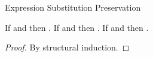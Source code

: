 \begin{lemma}{Expression Substitution Preservation}

\label{lemexp}

If \judeh{\envexte{\env}{\first{\varvarh}}{\first{\vartyh}}}{\first{\varexph}}{\second{\vartyh}} and \judeh{\env}{\second{\varexph}}{\first{\vartyh}} then \judeh{\env}{\expsubst{\first{\varexph}}{\second{\varexph}}{\first{\varvarh}}}{\second{\vartyh}}.  If \judem{\envexte{\env}{\first{\varvarm}}{\first{\vartym}}}{\first{\varexpm}}{\second{\vartym}} and \judem{\env}{\second{\varexpm}}{\first{\vartym}} then \judem{\env}{\expsubst{\first{\varexpm}}{\second{\varexpm}}{\first{\varvarm}}}{\second{\vartym}}.  If \judes{\envexte{\env}{\first{\varvars}}{\tytst}}{\first{\varexps}}{\tytst} and \judes{\env}{\second{\varexps}}{\tytst} then \judes{\env}{\expsubst{\first{\varexps}}{\second{\varexps}}{\first{\varvars}}}{\tytst}.

\begin{proof}

By structural induction.

\end{proof}

\end{lemma}
